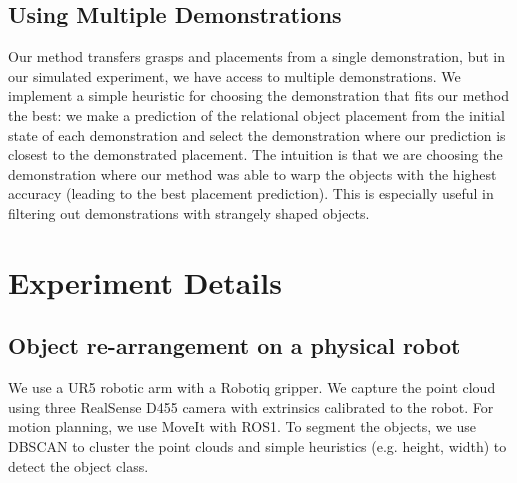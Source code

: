 \documentclass{article}
\begin{document}
\subsection{Using Multiple Demonstrations}

Our method transfers grasps and placements from a single demonstration, but in our simulated experiment, we have access to multiple demonstrations. We implement a simple heuristic for choosing the demonstration that fits our method the best: we make a prediction of the relational object placement from the initial state of each demonstration and select the demonstration where our prediction is closest to the demonstrated placement. The intuition is that we are choosing the demonstration where our method was able to warp the objects with the highest accuracy (leading to the best placement prediction). This is especially useful in filtering out demonstrations with strangely shaped objects.

\section{Experiment Details}
\label{appendix:experiment}

\subsection{Object re-arrangement on a physical robot}
\label{appendix:experiment:rearrangement}

We use a UR5 robotic arm with a Robotiq gripper. We capture the point cloud using three RealSense D455 camera with extrinsics calibrated to the robot. For motion planning, we use MoveIt with ROS1. To segment the objects, we use DBSCAN to cluster the point clouds and simple heuristics (e.g. height, width) to detect the object class.
\end{document}
